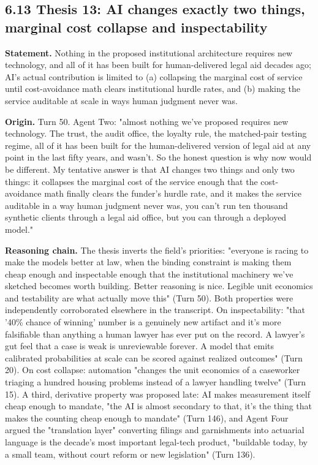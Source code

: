 \documentclass[sigconf,nonacm=true]{acmart}
\begin{document}
\subsection{6.13 Thesis 13: AI changes exactly two things,  marginal cost collapse and inspectability}

\textbf{Statement.} Nothing in the proposed institutional architecture requires new technology, and all of it has been built for human-delivered legal aid decades ago; AI's actual contribution is limited to (a) collapsing the marginal cost of service until cost-avoidance math clears institutional hurdle rates, and (b) making the service auditable at scale in ways human judgment never was.

\textbf{Origin.} Turn 50. Agent Two: "almost nothing we've proposed requires new technology. The trust, the audit office, the loyalty rule, the matched-pair testing regime,  all of it has been built for the human-delivered version of legal aid at any point in the last fifty years, and wasn't. So the honest question is why now would be different. My tentative answer is that AI changes two things and only two things: it collapses the marginal cost of the service enough that the cost-avoidance math finally clears the funder's hurdle rate, and it makes the service auditable in a way human judgment never was,  you can't run ten thousand synthetic clients through a legal aid office, but you can through a deployed model."

\textbf{Reasoning chain.} The thesis inverts the field's priorities: "everyone is racing to make the models better at law, when the binding constraint is making them cheap enough and inspectable enough that the institutional machinery we've sketched becomes worth building. Better reasoning is nice. Legible unit economics and testability are what actually move this" (Turn 50). Both properties were independently corroborated elsewhere in the transcript. On inspectability: "that '40\% chance of winning' number is a genuinely new artifact and it's more falsifiable than anything a human lawyer has ever put on the record. A lawyer's gut feel that a case is weak is unreviewable forever. A model that emits calibrated probabilities at scale can be scored against realized outcomes" (Turn 20). On cost collapse: automation "changes the unit economics of a caseworker triaging a hundred housing problems instead of a lawyer handling twelve" (Turn 15). A third, derivative property was proposed late: AI makes measurement itself cheap enough to mandate,  "the AI is almost secondary to that,  it's the thing that makes the counting cheap enough to mandate" (Turn 146),  and Agent Four argued the "translation layer" converting filings and garnishments into actuarial language is the decade's most important legal-tech product, "buildable today, by a small team, without court reform or new legislation" (Turn 136).
\end{document}
